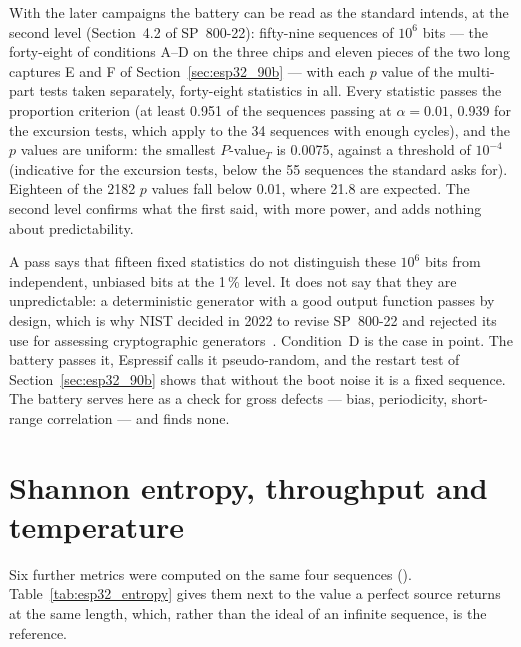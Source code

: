 With the later campaigns the battery can be read as the standard
intends, at the second level (Section~4.2 of SP~800-22): fifty-nine
sequences of $10^6$ bits --- the forty-eight of conditions A--D on the
three chips and eleven pieces of the two long captures E and F of
Section~\ref{sec:esp32_90b} --- with each $p$ value of the multi-part
tests taken separately, forty-eight statistics in all. Every statistic
passes the proportion criterion (at least 0.951 of the sequences passing
at $\alpha = 0.01$, 0.939 for the excursion tests, which apply to the 34
sequences with enough cycles), and the $p$ values are uniform: the
smallest $P$-value$_T$ is 0.0075, against a threshold of $10^{-4}$
(indicative for the excursion tests, below the 55 sequences the standard
asks for).
Eighteen of the 2182 $p$ values fall below 0.01, where 21.8 are
expected. The second level confirms what the first said, with more
power, and adds nothing about predictability.

A pass says that fifteen fixed statistics do not distinguish these
$10^6$ bits from independent, unbiased bits at the 1\,\% level. It does
not say that they are unpredictable: a deterministic generator with a
good output function passes by design, which is why NIST decided in 2022
to revise SP~800-22 and rejected its use for assessing cryptographic
generators~\cite{nist_2022_decision}. Condition~D is the case in point.
The battery passes it, Espressif calls it pseudo-random, and the restart
test of Section~\ref{sec:esp32_90b} shows that without the boot noise it
is a fixed sequence. The battery serves here as a check for gross defects
--- bias, periodicity, short-range correlation --- and finds none.

\section{Shannon entropy, throughput and temperature}
\label{sec:esp32_shannon}

Six further metrics were computed on the same four sequences
(). Table~\ref{tab:esp32_entropy}
gives them next to the value a perfect source returns at the same
length, which, rather than the ideal of an infinite sequence, is the
reference.

